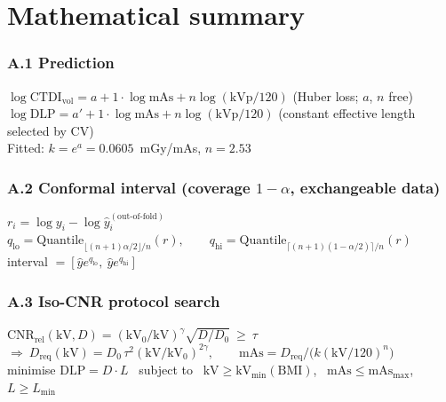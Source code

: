 \documentclass[10pt,a4paper]{article}
\newcommand{\ctdi}{\ensuremath{\mathrm{CTDI}_{\mathrm{vol}}}}
\newcommand{\mgy}{mGy}
\begin{document}
\clearpage
\appendix
\section{Mathematical summary}

\subsubsection{A.1 Prediction}
\begin{eqbox}
$\log \ctdi = a + 1\cdot\log \mathrm{mAs} + n\log(\mathrm{kVp}/120)$ \hfill (Huber loss; $a$, $n$ free)\\[4pt]
$\log \mathrm{DLP} = a' + 1\cdot\log \mathrm{mAs} + n\log(\mathrm{kVp}/120)$ \hfill (constant effective length selected by CV)\\[4pt]
Fitted: $k = e^{a} = 0.0605$~\mgy/mAs, $n = 2.53$
\end{eqbox}

\subsubsection{A.2 Conformal interval (coverage $1-\alpha$, exchangeable data)}
\begin{eqbox}
$r_i = \log y_i - \log \hat{y}_i^{(\text{out-of-fold})}$\\[4pt]
$q_{\text{lo}} = \mathrm{Quantile}_{\lfloor (n+1)\alpha/2 \rfloor / n}(r), \qquad
 q_{\text{hi}} = \mathrm{Quantile}_{\lceil (n+1)(1-\alpha/2) \rceil / n}(r)$\\[4pt]
interval $= [\hat{y}e^{q_{\text{lo}}},\ \hat{y}e^{q_{\text{hi}}}]$
\end{eqbox}

\subsubsection{A.3 Iso-CNR protocol search}
\begin{eqbox}
$\mathrm{CNR_{rel}}(\mathrm{kV}, D) = (\mathrm{kV_0}/\mathrm{kV})^{\gamma}\sqrt{D/D_0} \ \ge\ \tau$\\[4pt]
$\Rightarrow\ D_{\text{req}}(\mathrm{kV}) = D_0\,\tau^{2}(\mathrm{kV}/\mathrm{kV_0})^{2\gamma}, \qquad
\mathrm{mAs} = D_{\text{req}} / \big(k(\mathrm{kV}/120)^{n}\big)$\\[4pt]
minimise $\mathrm{DLP} = D\cdot L$ \ subject to \ $\mathrm{kV} \ge \mathrm{kV_{min}(BMI)}$, \
$\mathrm{mAs} \le \mathrm{mAs_{max}}$, \ $L \ge L_{\min}$
\end{eqbox}
\end{document}
